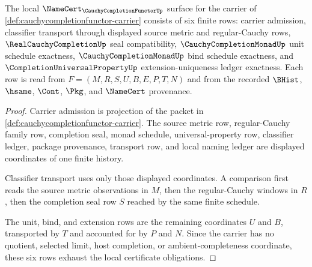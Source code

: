 \begin{theorem}
\label{thm:cauchycompletionfunctor-namecert-obligations}
The local $\NameCert_{\CauchyCompletionFunctorUp}$ surface for the carrier of \autoref{def:cauchycompletionfunctor-carrier} consists of six finite rows: carrier admission, classifier transport through displayed source metric and regular-Cauchy rows, $\RealCauchyCompletionUp$ seal compatibility, $\CauchyCompletionMonadUp$ unit schedule exactness, $\CauchyCompletionMonadUp$ bind schedule exactness, and $\CompletionUniversalPropertyUp$ extension-uniqueness ledger exactness. Each row is read from $F=(M,R,S,U,B,E,P,T,N)$ and from the recorded $\BHist$, $\hsame$, $\Cont$, $\Pkg$, and $\NameCert$ provenance.
\end{theorem}
\begin{proof}
Carrier admission is projection of the packet in \autoref{def:cauchycompletionfunctor-carrier}. The source metric row, regular-Cauchy family row, completion seal, monad schedule, universal-property row, classifier ledger, package provenance, transport row, and local naming ledger are displayed coordinates of one finite history.

Classifier transport uses only those displayed coordinates. A comparison first reads the source metric observations in $M$, then the regular-Cauchy windows in $R$, then the completion seal row $S$ reached by the same finite schedule.

The unit, bind, and extension rows are the remaining coordinates $U$ and $B$, transported by $T$ and accounted for by $P$ and $N$. Since the carrier has no quotient, selected limit, host completion, or ambient-completeness coordinate, these six rows exhaust the local certificate obligations.
\end{proof}

